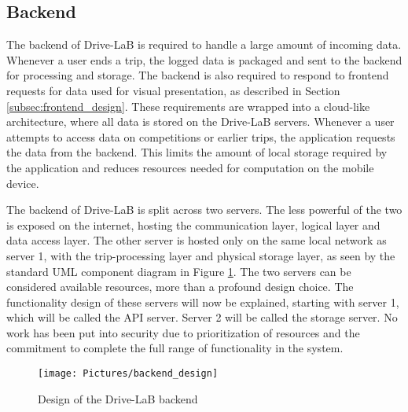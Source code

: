 \subsection{Backend}\label{subsec:backend_design}
The backend of Drive-LaB is required to handle a large amount of incoming data. Whenever a user ends a trip, the logged data is packaged and sent to the backend for processing and storage. The backend is also required to respond to frontend requests for data used for visual presentation, as described in Section \ref{subsec:frontend_design}. These requirements are wrapped into a cloud-like architecture, where all data is stored on the Drive-LaB servers. Whenever a user attempts to access data on competitions or earlier trips, the application requests the data from the backend. This   limits the amount of local storage required by the application and reduces resources needed for computation on the mobile device.

The backend of Drive-LaB is split across two servers. The less powerful of the two is exposed on the internet, hosting the communication layer, logical layer and data access layer. The other server is hosted only on the same local network as server 1, with the trip-processing layer and physical storage layer, as seen by the standard UML component diagram in Figure \ref{fig:backend_design}. The two servers can be considered available resources, more than a profound design choice. The functionality design of these servers will now be explained, starting with server 1, which will be called the API server. Server 2 will be called the storage server. No work has been put into security due to prioritization of resources and the commitment to complete the full range of functionality in the system.

\begin{figure}[tb]
\centering
\texttt{[image: Pictures/backend\_design]}
\caption{Design of the Drive-LaB backend}
\label{fig:backend_design}
\end{figure}